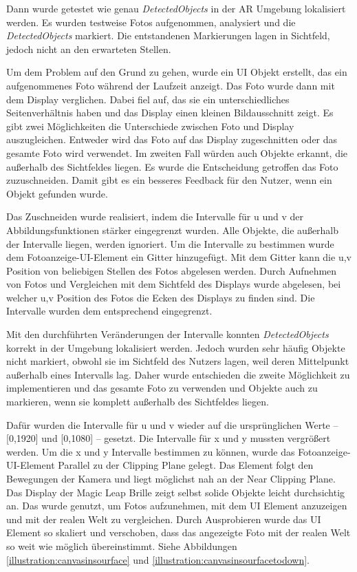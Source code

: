 Dann wurde getestet wie genau \textit{DetectedObjects} in der AR Umgebung lokalisiert werden. Es wurden testweise Fotos aufgenommen, analysiert und die \textit{DetectedObjects} markiert. Die entstandenen Markierungen lagen in Sichtfeld, jedoch nicht an den erwarteten Stellen. 

Um dem Problem auf den Grund zu gehen, wurde ein UI Objekt erstellt, das ein aufgenommenes Foto während der Laufzeit anzeigt. Das Foto wurde dann mit dem Display verglichen. Dabei fiel auf, das sie ein unterschiedliches Seitenverhältnis haben und das Display einen kleinen Bildausschnitt zeigt. Es gibt zwei Möglichkeiten die Unterschiede zwischen Foto und Display auszugleichen. Entweder wird das Foto auf das Display zugeschnitten oder das gesamte Foto wird verwendet. Im zweiten Fall würden auch Objekte erkannt, die außerhalb des Sichtfeldes liegen. Es wurde die Entscheidung getroffen das Foto zuzuschneiden. Damit gibt es ein besseres Feedback für den Nutzer, wenn ein Objekt gefunden wurde. 

Das Zuschneiden wurde realisiert, indem die Intervalle für u und v der Abbildungsfunktionen stärker eingegrenzt wurden. Alle Objekte, die außerhalb der Intervalle liegen, werden ignoriert. Um die Intervalle zu bestimmen wurde dem Fotoanzeige-UI-Element ein Gitter hinzugefügt. Mit dem Gitter kann die u,v Position von beliebigen Stellen des Fotos abgelesen werden. Durch Aufnehmen von Fotos und Vergleichen mit dem Sichtfeld des Displays wurde abgelesen, bei welcher u,v Position des Fotos die Ecken des Displays zu finden sind. Die Intervalle wurden dem entsprechend eingegrenzt. 

Mit den durchführten Veränderungen der Intervalle konnten \textit{DetectedObjects} korrekt in der Umgebung lokalisiert werden. Jedoch wurden sehr häufig Objekte nicht markiert, obwohl sie im Sichtfeld des Nutzers lagen, weil deren Mittelpunkt außerhalb eines Intervalls lag. Daher wurde entschieden die zweite Möglichkeit zu implementieren und das gesamte Foto zu verwenden und Objekte auch zu markieren, wenn sie komplett außerhalb des Sichtfeldes liegen. 

Dafür wurden die Intervalle für u und v wieder auf die ursprünglichen Werte – [0,1920] und [0,1080] –  gesetzt. Die Intervalle für x und y mussten vergrößert werden. Um die x und y Intervalle bestimmen zu können, wurde das Fotoanzeige-UI-Element Parallel zu der Clipping Plane gelegt. Das Element folgt den Bewegungen der Kamera und liegt möglichst nah an der Near Clipping Plane. Das Display der Magic Leap Brille zeigt selbst solide Objekte leicht durchsichtig an. Das wurde genutzt, um Fotos aufzunehmen, mit dem UI Element anzuzeigen und mit der realen Welt zu vergleichen. Durch Ausprobieren wurde das UI Element so skaliert und verschoben, dass das angezeigte Foto mit der realen Welt so weit wie möglich übereinstimmt. Siehe Abbildungen \ref{illustration:canvasinsourface} und \ref{illustration:canvasinsourfacetodown}.

